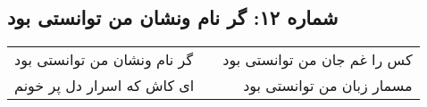 \begin{center}
\section*{شماره ۱۲: گر نام ونشان من توانستی بود}
\label{sec:012}
\begin{longtable}{l p{0.5cm} r}
گر نام ونشان من توانستی بود
&&
کس را غم جان من توانستی بود
\\
ای کاش که اسرار دل پر خونم
&&
مسمار زبان من توانستی بود
\\
\end{longtable}
\end{center}
